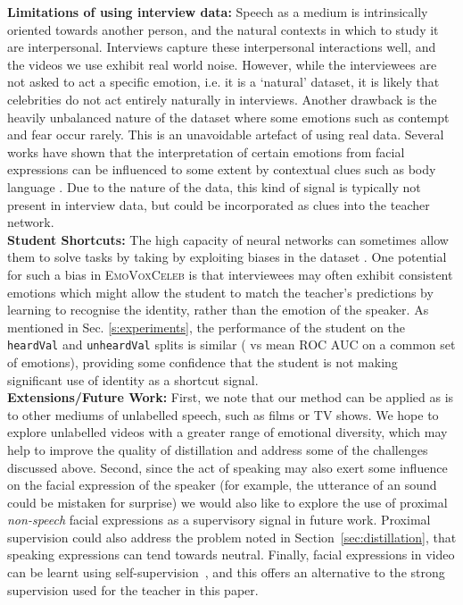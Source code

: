 \documentclass[sigconf]{acmart}
\newcommand{\datasetName}{\textsc{EmoVoxCeleb}}
\begin{document}
\noindent\textbf{Limitations of using interview data:} Speech as a medium is intrinsically oriented towards
another person, and the natural contexts in which to study it are interpersonal. Interviews capture these interpersonal interactions well, and the videos we use exhibit real world noise. However, while the interviewees are not asked to act a specific emotion, i.e. it is a `natural' dataset, it is likely that celebrities do not act entirely naturally in interviews. Another drawback is the heavily unbalanced nature of the dataset where some emotions such as contempt and fear occur rarely. This is an unavoidable artefact of using real data. Several works have shown that the interpretation of certain emotions from facial expressions can be influenced to some extent by contextual clues such as body language \cite{aviezer2009not,hassin2013inherently}. Due to the  nature of the data, this kind of signal is typically not present in interview data, but could be incorporated as clues into the teacher network.\\
\noindent\textbf{Student Shortcuts:} The high capacity of neural networks can sometimes allow them to solve tasks by taking  by exploiting biases in the dataset \cite{doersch2015unsupervised}. One potential for such a bias in \datasetName{} is that interviewees may often exhibit consistent emotions which might allow the student to match the teacher's predictions by learning to recognise the identity, rather than the emotion of the speaker. As mentioned in Sec. \ref{s:experiments}, the performance of the student on the \texttt{heardVal} and \texttt{unheardVal} splits is similar ( vs  mean ROC AUC on a common set of emotions), providing some confidence that the student is not making significant use of identity as a shortcut signal. \\
\noindent\textbf{Extensions/Future Work:}
First, we note that our method can be applied as is to other mediums of
unlabelled speech, such as films or TV shows.  We hope to explore
unlabelled videos with a greater range of emotional diversity, which
may help to improve the quality of distillation and address some of
the challenges discussed above. Second, since the act of speaking may also
exert some influence on the facial expression of the speaker (for
example, the utterance of an  sound could be mistaken for
surprise)  we would also like to
explore the use of proximal {\em non-speech} facial expressions as a
supervisory signal in future work. Proximal supervision could also address the problem
noted in Section~\ref{sec:distillation}, that
speaking expressions can tend towards neutral. Finally, 
facial
expressions in  video can be learnt using 
self-supervision~\cite{wiles2018self}, and this offers an alternative to the strong supervision
used for the teacher in this paper.
\end{document}
